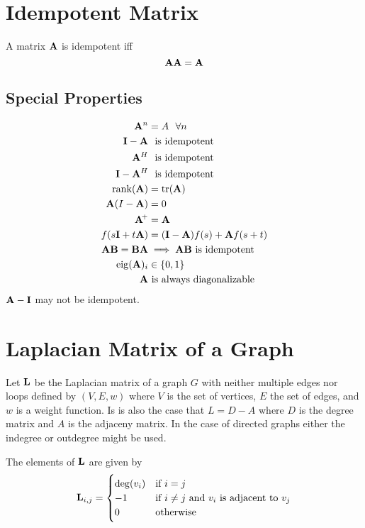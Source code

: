 \section{Idempotent Matrix}
A matrix $\mathbf{A}$ is idempotent iff
\begin{equation}
\mathbf{A}\mathbf{A}=\mathbf{A}
\end{equation}

\subsection*{Special Properties}
\begin{align}
\mathbf{A}^n        &=A~~\forall n              \\
\mathbf{I}-\mathbf{A}      &~~\textrm{is idempotent}   \\
\mathbf{A}^H        &~~\textrm{is idempotent}   \\
\mathbf{I}-\mathbf{A}^H    &~~\textrm{is idempotent}   \\
\operatorname{rank}(\mathbf{A})   &= \operatorname{tr}(\mathbf{A})              \\
\mathbf{A}(I-\mathbf{A})   &= 0                        \\
\mathbf{A}\!^+     &= \mathbf{A}                      \\
f(s\mathbf{I}+t\mathbf{A}) &= (\mathbf{I}-\mathbf{A})f(s)+\mathbf{A} f(s+t) \\
\mathbf{A}\mathbf{B}=\mathbf{B}\mathbf{A}&\implies \mathbf{A}\mathbf{B}~\textrm{is idempotent} \\
\operatorname{eig}(\mathbf{A})_i  &\in \{0,1\} \\
\mathbf{A} & \textrm{~is always diagonalizable}
\end{align}
$\mathbf{A}-\mathbf{I}$ may not be idempotent.



\section{Laplacian Matrix of a Graph}
Let $\mathbf{L}$ be the Laplacian matrix of a graph $G$ with neither multiple edges nor loops defined by $(V,E,w)$ where $V$ is the set of vertices, $E$ the set of edges, and $w$ is a weight function. Is is also the case that $L=D-A$ where $D$ is the degree matrix and $A$ is the adjaceny matrix. In the case of directed graphs either the indegree or outdegree might be used.

The elements of $\mathbf{L}$ are given by
\begin{equation}
\mathbf{L}_{i,j} = \begin{cases}
  \deg(v_i) & \textrm{if $i=j$} \\
  -1        & \textrm{if $i\ne j$ and $v_i$ is adjacent to $v_j$} \\
   0        & \textrm{otherwise}
\end{cases}
\end{equation}

